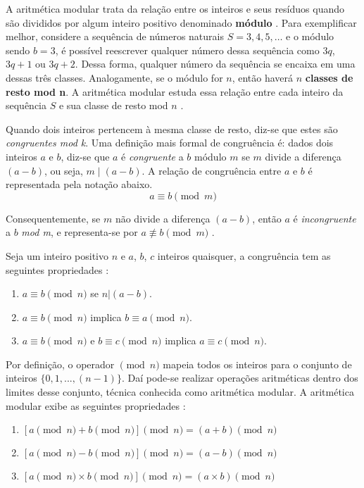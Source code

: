 A aritmética modular trata da relação entre os inteiros e seus resíduos quando são divididos por algum inteiro positivo denominado \textbf{módulo} \cite{Lewinter:2015}. 
Para exemplificar melhor, considere a sequência de números naturais $S = 3, 4, 5, \dots$ e o módulo sendo $b = 3$, é possível reescrever qualquer número dessa sequência 
como \(3q\), \(3q + 1\) ou \(3q + 2\). Dessa forma, qualquer número da sequência se encaixa em uma dessas três classes. Analogamente, se o módulo for \(n\), então haverá 
\(n\) \textbf{classes de resto mod n}. A aritmética modular estuda essa relação entre cada inteiro da sequência \(S\) e sua classe de resto mod \(n\) \cite{Lewinter:2015}.

Quando dois inteiros pertencem à mesma classe de resto, diz-se que estes são \textit{congruentes mod k}. Uma definição mais formal de congruência é: dados dois inteiros \(a\) e \(b\), diz-se que \(a\) é \textit{congruente} a \(b\) módulo \(m\) se \(m\) divide a diferença $(a-b)$, ou seja, $m \mid (a-b)$. A relação de congruência entre \(a\) e \(b\) é representada pela notação abaixo.
\begin{equation}
  a \equiv b \pmod m \label{eq:1}
\end{equation}

Consequentemente, se \(m\) não divide a diferença $(a - b)$, então \(a\) é \textit{incongruente} a \(b\) \textit{mod m}, e representa-se por $a \not\equiv b \pmod m$ \cite{Santos:2014}.

Seja um inteiro positivo \(n\) e \(a\), \(b\), \(c\) inteiros quaisquer, a congruência tem as seguintes propriedades \cite{Stallings:2011}:
\begin{enumerate}
  \item $a \equiv b \pmod n$ se $n|(a - b)$.
  \item $a \equiv b \pmod n$ implica $b \equiv a \pmod n$.
  \item $a \equiv b \pmod n$ e $b \equiv c \pmod n$ implica $a \equiv c \pmod n$.
\end{enumerate}

Por definição, o operador $\pmod n$ mapeia todos os inteiros para o conjunto de inteiros $\{0, 1, ..., (n-1)\}$. Daí pode-se realizar operações aritméticas dentro dos limites desse conjunto, técnica conhecida como aritmética modular. A aritmética modular exibe as seguintes propriedades \cite{Stallings:2011}:
\begin{enumerate}
  \item $[a \pmod n + b \pmod n] \pmod n = (a + b) \pmod n$
  \item $[a \pmod n - b \pmod n] \pmod n = (a - b) \pmod n$
  \item $[a \pmod n \times b \pmod n] \pmod n = (a \times b) \pmod n$
\end{enumerate}

